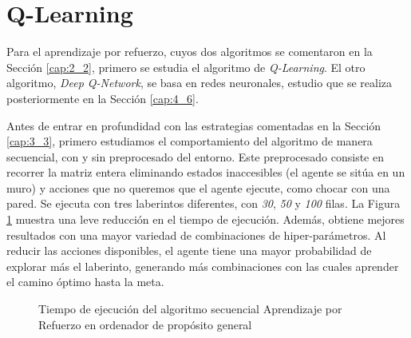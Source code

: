 
\section{Q-Learning}	

Para el aprendizaje por refuerzo, cuyos dos algoritmos se comentaron en la Sección \ref{cap:2_2}, primero se estudia el algoritmo de \textit{Q-Learning}. El otro algoritmo, \textit{Deep Q-Network}, se basa en redes neuronales, estudio que se realiza posteriormente en la Sección \ref{cap:4_6}.


Antes de entrar en profundidad con las estrategias comentadas en la Sección \ref{cap:3_3}, primero estudiamos el comportamiento del algoritmo de manera secuencial, con y sin preprocesado del entorno. Este preprocesado consiste en recorrer la matriz entera eliminando estados inaccesibles (el agente se sitúa en un muro) y acciones que no queremos que el agente ejecute, como chocar con una pared. Se ejecuta con tres laberintos diferentes, con \textit{30}, \textit{50} y \textit{100} filas. La Figura \ref{fig:rl_preprocesado} muestra una leve reducción en el tiempo de ejecución. Además, obtiene mejores resultados con una mayor variedad de combinaciones de hiper-parámetros. Al reducir las acciones disponibles, el agente tiene una mayor probabilidad de explorar más el laberinto, generando más combinaciones con las cuales aprender el camino óptimo hasta la meta.			


\begin{figure}[!h]
	\centering
	\caption{Tiempo de ejecución del algoritmo secuencial Aprendizaje por Refuerzo en ordenador de propósito general}
	\label{fig:rl_preprocesado}
\end{figure}



